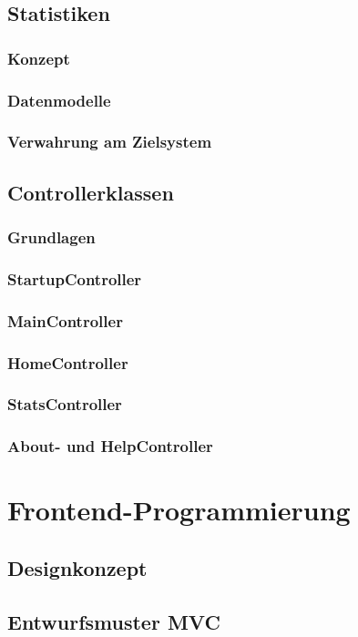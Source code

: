 \subsection{Statistiken}
\subsubsection{Konzept}
\subsubsection{Datenmodelle}
\subsubsection{Verwahrung am Zielsystem}

\subsection{Controllerklassen}
\subsubsection{Grundlagen}
\subsubsection{StartupController}
\subsubsection{MainController}
\subsubsection{HomeController}
\subsubsection{StatsController}
\subsubsection{About- und HelpController}


\section{Frontend-Programmierung}
\subsection{Designkonzept}
\subsection{Entwurfsmuster MVC}
